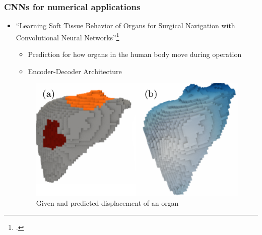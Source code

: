 \documentclass[18pt]{beamer}
\begin{document}
\begin{frame}
  \frametitle{CNNs for numerical applications}
  \begin{itemize}

  \item ``Learning Soft Tissue Behavior of Organs for Surgical Navigation with Convolutional Neural Networks''\footcite{pfeiffer2019}
    \begin{itemize}
    \item Prediction for how organs in the human body move during operation
    \item Encoder-Decoder Architecture
    \end{itemize}
    \vspace{0.25cm}
    
    \begin{center}
      \begin{figure}[htb]
        \includegraphics[scale=0.35]{images/organs_move_1}
        \caption{Given and predicted displacement of an organ}
      \end{figure}
    \end{center}
    
  \end{itemize}
  
\end{frame}
  
\end{document}
